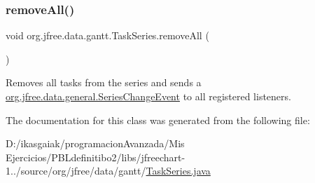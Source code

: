 \subsubsection{\texorpdfstring{remove\+All()}{removeAll()}}
{\footnotesize\ttfamily void org.\+jfree.\+data.\+gantt.\+Task\+Series.\+remove\+All (\begin{DoxyParamCaption}{ }\end{DoxyParamCaption})}

Removes all tasks from the series and sends a \mbox{\hyperlink{classorg_1_1jfree_1_1data_1_1general_1_1_series_change_event}{org.\+jfree.\+data.\+general.\+Series\+Change\+Event}} to all registered listeners. 

The documentation for this class was generated from the following file\+:\begin{DoxyCompactItemize}
\item 
D\+:/ikasgaiak/programacion\+Avanzada/\+Mis Ejercicios/\+P\+B\+Ldefinitibo2/libs/jfreechart-\/1../source/org/jfree/data/gantt/\mbox{\hyperlink{_task_series_8java}{Task\+Series.\+java}}\end{DoxyCompactItemize}
